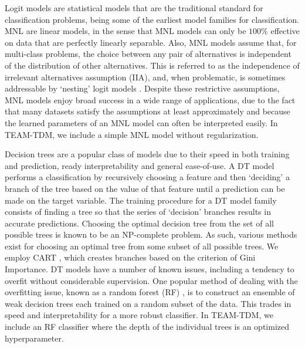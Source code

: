\documentclass[numbered]{trbunofficial}
\begin{document}
Logit models  are statistical models that are the traditional standard for classification problems, being some of the earliest model families for classification.
 MNL are linear models, in the sense that MNL models can only be $100\%$ effective on data that are perfectly linearly separable.
 Also, MNL models assume that, for multi-class problems, the choice between any pair of alternatives is independent of the distribution of other alternatives.
 This is referred to as the independence of irrelevant alternatives assumption (IIA), and, when problematic, is sometimes addressable by `nesting' logit models .
 Despite these restrictive assumptions, MNL models enjoy broad success in a wide range of applications, due to the fact that many datasets satisfy the assumptions at least approximately and because the learned parameters of an MNL model can often be interpreted easily.
 In TEAM-TDM, we include a simple MNL model without regularization.

Decision trees  are a popular class of models due to their speed in both training and prediction, ready interpretability and general ease-of-use.
 A DT model performs a classification by recursively choosing a feature and then `deciding' a branch of the tree based on the value of that feature until a prediction can be made on the target variable.
 The training procedure for a DT model family consists of finding a tree so that the series of `decision' branches results in accurate predictions.
 Choosing the optimal decision tree from the set of all possible trees is known to be an NP-complete problem.
 As such, various methods exist for choosing an optimal tree from some subset of all possible trees.
 We employ CART , which creates branches based on the criterion of Gini Importance.
 DT models have a number of known issues, including a tendency to overfit without considerable supervision.
 One popular method of dealing with the overfitting issue, known as a random forest (RF) , is to construct an ensemble of weak decision trees each trained on a random subset of the data.
 This trades in speed and interpretability for a more robust classifier.
 In TEAM-TDM, we include an RF classifier where the depth of the individual trees is an optimized hyperparameter.
\end{document}
